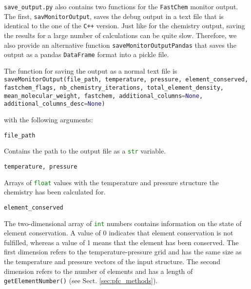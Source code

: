 \documentclass[numbers=noenddot]{fcmanual}
\newcommand{\fc}{\texttt{FastChem}\xspace}
\newcommand{\cpp}{\ttt{C++}\xspace}
\newcommand{\ttt}[1]{\texttt {#1}}
\begin{document}
\texttt{save\_output.py} also contains two functions for the \fc monitor output. The first, \lstinline[language=Python]!savMonitorOutput!, saves the debug output in a text file that is identical to the one of the \cpp version. Just like for the chemistry output, saving the results for a large number of calculations can be quite slow. Therefore, we also provide an alternative function \lstinline[language=Python]!saveMonitorOutputPandas! that saves the output as a pandas \lstinline[language=Python]!DataFrame! format into a pickle file. 

The function for saving the output as a normal text file is\\

\lstinline[language=Python, breaklines, breakatwhitespace]!saveMonitorOutput(file_path, temperature, pressure, element_conserved, fastchem_flags, nb_chemistry_iterations, total_element_density, mean_molecular_weight, fastchem, additional_columns=None, additional_columns_desc=None)!

\bigbreak

with the following arguments:

\bigbreak

\lstinline[language=Python]!file_path!
\begin{addmargin}[25pt]{0pt}
	Contains the path to the output file as a \lstinline[language=Python]!str! variable.
\end{addmargin}


\bigbreak

\lstinline[language=Python]!temperature, pressure!
\begin{addmargin}[25pt]{0pt}
	Arrays of \lstinline[language=Python]!float! values with the temperature and pressure structure the chemistry has been calculated for.
\end{addmargin}

\bigbreak

\lstinline!element_conserved!
\begin{addmargin}[25pt]{0pt}
	The two-dimensional array of \lstinline[language=Python]!int! numbers contains information on the state of element conservation. A value of 0 indicates that element conservation is not fulfilled, whereas a value of 1 means that the element has been conserved. The first dimension refers to the temperature-pressure grid and has the same size as the temperature and pressure vectors of the input structure. The second dimension refers to the number of elements and has a length of \lstinline!getElementNumber()! (see Sect. \ref{sec:pfc_methods}).
\end{addmargin}
\end{document}
